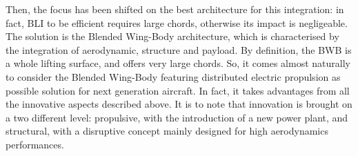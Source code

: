 Then, the focus has been shifted on the best architecture for this integration: in fact, BLI to be efficient requires large chords, otherwise its impact is negligeable. 
The solution is the Blended Wing-Body architecture, which is characterised by the integration of aerodynamic, structure and payload. 
By definition, the BWB is a whole lifting surface, and offers very large chords. 
So, it comes almost naturally to consider the Blended Wing-Body featuring distributed electric propulsion as possible solution for next generation aircraft. 
In fact, it takes advantages from all the innovative aspects described above. 
It is to note that innovation is brought on a two different level: propulsive, with the introduction of a new power plant, and structural, with a disruptive concept mainly designed for high aerodynamics performances. 

